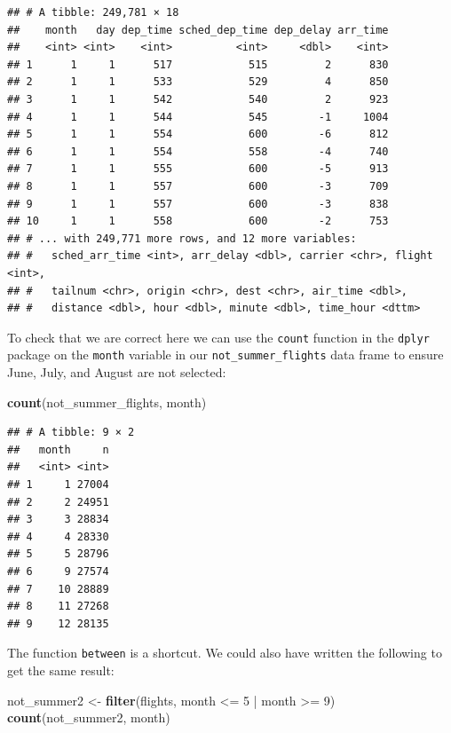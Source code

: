 \documentclass[]{tufte-book}
\newenvironment{Shaded}{\begin{snugshade}}{\end{snugshade}}
\newcommand{\KeywordTok}[1]{\textcolor[rgb]{0.13,0.29,0.53}{\textbf{{#1}}}}
\newcommand{\DecValTok}[1]{\textcolor[rgb]{0.00,0.00,0.81}{{#1}}}
\newcommand{\StringTok}[1]{\textcolor[rgb]{0.31,0.60,0.02}{{#1}}}
\newcommand{\NormalTok}[1]{{#1}}
\begin{document}
\begin{verbatim}
## # A tibble: 249,781 × 18
##    month   day dep_time sched_dep_time dep_delay arr_time
##    <int> <int>    <int>          <int>     <dbl>    <int>
## 1      1     1      517            515         2      830
## 2      1     1      533            529         4      850
## 3      1     1      542            540         2      923
## 4      1     1      544            545        -1     1004
## 5      1     1      554            600        -6      812
## 6      1     1      554            558        -4      740
## 7      1     1      555            600        -5      913
## 8      1     1      557            600        -3      709
## 9      1     1      557            600        -3      838
## 10     1     1      558            600        -2      753
## # ... with 249,771 more rows, and 12 more variables:
## #   sched_arr_time <int>, arr_delay <dbl>, carrier <chr>, flight <int>,
## #   tailnum <chr>, origin <chr>, dest <chr>, air_time <dbl>,
## #   distance <dbl>, hour <dbl>, minute <dbl>, time_hour <dttm>
\end{verbatim}

To check that we are correct here we can use the \texttt{count} function
in the \texttt{dplyr} package on the \texttt{month} variable in our
\texttt{not\_summer\_flights} data frame to ensure June, July, and
August are not selected:

\begin{Shaded}
\begin{Highlighting}[]
\KeywordTok{count}\NormalTok{(not_summer_flights, month)}
\end{Highlighting}
\end{Shaded}

\begin{verbatim}
## # A tibble: 9 × 2
##   month     n
##   <int> <int>
## 1     1 27004
## 2     2 24951
## 3     3 28834
## 4     4 28330
## 5     5 28796
## 6     9 27574
## 7    10 28889
## 8    11 27268
## 9    12 28135
\end{verbatim}

The function \texttt{between} is a shortcut. We could also have written
the following to get the same result:

\begin{Shaded}
\begin{Highlighting}[]
\NormalTok{not_summer2 <-}\StringTok{ }\KeywordTok{filter}\NormalTok{(flights, month <=}\StringTok{ }\DecValTok{5} \NormalTok{|}\StringTok{ }\NormalTok{month >=}\StringTok{ }\DecValTok{9}\NormalTok{)}
\KeywordTok{count}\NormalTok{(not_summer2, month)}
\end{Highlighting}
\end{Shaded}
\end{document}
